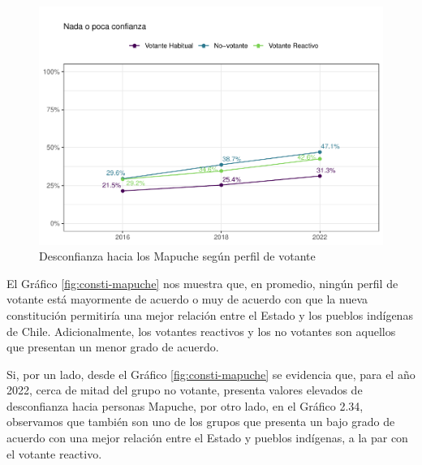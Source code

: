 \documentclass[
  12pt,
]{book}
\begin{document}
\begin{figure}

{\centering \includegraphics{reporte-elsoc_files/figure-latex/desconf-mapuche-1} 

}

\caption{Desconfianza hacia los Mapuche según perfil de votante}\label{fig:desconf-mapuche}
\end{figure}

El Gráfico \ref{fig:consti-mapuche} nos muestra que, en promedio, ningún perfil de votante está mayormente de acuerdo o muy de acuerdo con que la nueva constitución permitiría una mejor relación entre el Estado y los pueblos indígenas de Chile. Adicionalmente, los votantes reactivos y los no votantes son aquellos que presentan un menor grado de acuerdo.

Si, por un lado, desde el Gráfico \ref{fig:consti-mapuche} se evidencia que, para el año 2022, cerca de mitad del grupo no votante, presenta valores elevados de desconfianza hacia personas Mapuche, por otro lado, en el Gráfico 2.34, observamos que también son uno de los grupos que presenta un bajo grado de acuerdo con una mejor relación entre el Estado y pueblos indígenas, a la par con el votante reactivo.
\end{document}

